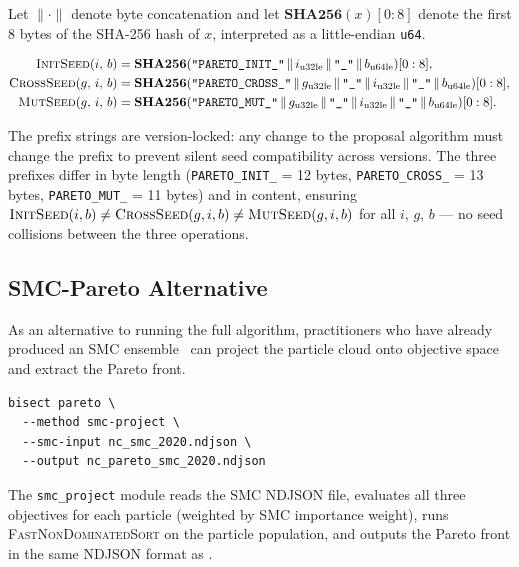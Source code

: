 \begin{definition}
\label{def:seeds}
Let $\|\cdot\|$ denote byte concatenation and let $\mathbf{SHA256}(x)[0:8]$
denote the first 8 bytes of the SHA-256 hash of $x$, interpreted as a
little-endian \texttt{u64}.

\begin{align*}
\textsc{InitSeed}(i,\, b) &= \mathbf{SHA256}(
  \texttt{"PARETO\_INIT\_"} \,\|\, i_{\mathrm{u32le}} \,\|\, \texttt{"\_"}
  \,\|\, b_{\mathrm{u64le}})[0:8], \\
\textsc{CrossSeed}(g,\, i,\, b) &= \mathbf{SHA256}(
  \texttt{"PARETO\_CROSS\_"} \,\|\, g_{\mathrm{u32le}} \,\|\, \texttt{"\_"}
  \,\|\, i_{\mathrm{u32le}} \,\|\, \texttt{"\_"} \,\|\, b_{\mathrm{u64le}})[0:8], \\
\textsc{MutSeed}(g,\, i,\, b) &= \mathbf{SHA256}(
  \texttt{"PARETO\_MUT\_"} \,\|\, g_{\mathrm{u32le}} \,\|\, \texttt{"\_"}
  \,\|\, i_{\mathrm{u32le}} \,\|\, \texttt{"\_"} \,\|\, b_{\mathrm{u64le}})[0:8].
\end{align*}
\end{definition}

The prefix strings are version-locked: any change to the proposal algorithm
must change the prefix to prevent silent seed compatibility across versions.
The three prefixes differ in byte length (\texttt{PARETO\_INIT\_} = 12 bytes,
\texttt{PARETO\_CROSS\_} = 13 bytes, \texttt{PARETO\_MUT\_} = 11 bytes) and
in content, ensuring
$\textsc{InitSeed}(i, b) \neq \textsc{CrossSeed}(g, i, b) \neq \textsc{MutSeed}(g, i, b)$
for all $i$, $g$, $b$ --- no seed collisions between the three operations.

\subsection{SMC-Pareto Alternative}

As an alternative to running the full \nsga{} algorithm, practitioners who
have already produced an SMC ensemble~\citep{dellaLibera2026smc} can project
the particle cloud onto objective space and extract the Pareto front.

\begin{verbatim}
bisect pareto \
  --method smc-project \
  --smc-input nc_smc_2020.ndjson \
  --output nc_pareto_smc_2020.ndjson
\end{verbatim}

The \texttt{smc\_project} module reads the SMC NDJSON file, evaluates all
three objectives for each particle (weighted by SMC importance weight),
runs \textsc{FastNonDominatedSort} on the particle population, and outputs
the Pareto front in the same NDJSON format as \nsga{}.

